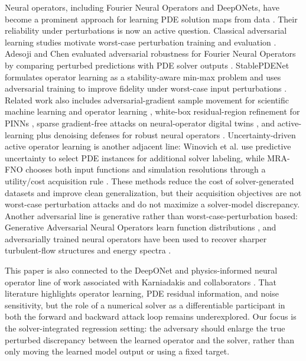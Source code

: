 \documentclass[letterpaper]{article} %
\begin{document}
Neural operators, including Fourier Neural Operators and DeepONets, have
become a prominent approach for learning PDE solution maps from data
\citep{li2021fourier,lu2021deeponet}. Their reliability under perturbations is
now an active question. Classical adversarial learning studies motivate
worst-case perturbation training and evaluation
\citep{goodfellow2015explaining,madry2018towards,zhang2019trades,croce2020autoattack}.
Adesoji and Chen evaluated adversarial robustness for
Fourier Neural Operators by comparing perturbed predictions with PDE solver
outputs \citep{adesoji2022evaluating}. StablePDENet formulates operator
learning as a stability-aware min-max problem and uses adversarial training to
improve fidelity under worst-case input perturbations
\citep{huang2026stablepdenet}. Related work also includes adversarial-gradient
sample movement for scientific machine learning and operator learning
\citep{ouyang2025rams}, white-box residual-region refinement for PINNs
\citep{shi2025wbar}, sparse gradient-free attacks on neural-operator
digital twins \citep{roy2026vulnerabilities}, and active-learning plus
denoising defenses for robust neural operators \citep{roy2026beyond}.
Uncertainty-driven active operator learning is another adjacent line:
Winovich et al. use predictive uncertainty to select PDE instances for
additional solver labeling, while MRA-FNO chooses both input functions and
simulation resolutions through a utility/cost acquisition rule
\citep{winovich2025active,li2024mrafno}. These methods reduce the cost of
solver-generated datasets and improve clean generalization, but their
acquisition objectives are not worst-case perturbation attacks and do not
maximize a solver-model discrepancy.
Another adversarial line is generative rather than worst-case-perturbation
based: Generative Adversarial Neural Operators learn function distributions
\citep{rahman2022gano}, and adversarially trained neural operators have been
used to recover sharper turbulent-flow structures and energy spectra
\citep{oommen2025turbulent}.

This paper is also connected to the DeepONet and physics-informed neural
operator line of work associated with Karniadakis and collaborators
\citep{raissi2019physics,li2021pino,lu2021faircomparison,goswami2022physicsinformed}.
That literature highlights operator learning, PDE residual information, and
noise sensitivity, but the role of a numerical solver as a differentiable
participant in both the forward and backward attack loop remains
underexplored. Our focus is the solver-integrated regression setting: the
adversary should enlarge the true perturbed discrepancy between the learned
operator and the solver, rather than only moving the learned model output or
using a fixed target.
\end{document}
